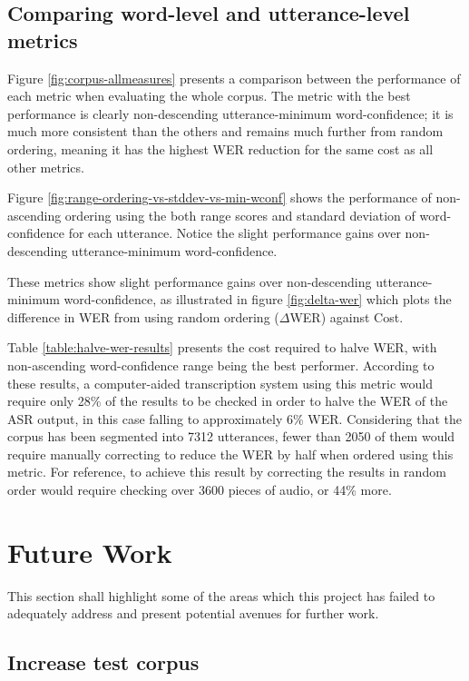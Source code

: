 \subsection{Comparing word-level and utterance-level metrics}

Figure \ref{fig:corpus-allmeasures} presents a comparison between the performance of each metric when evaluating the whole corpus.
The metric with the best performance is clearly non-descending utterance-minimum word-confidence; it is much more consistent than the others and remains much further from random ordering, meaning it has the highest WER reduction for the same cost as all other metrics.

Figure \ref{fig:range-ordering-vs-stddev-vs-min-wconf} shows the performance of non-ascending ordering using the both range scores and standard deviation of word-confidence for each utterance. 
Notice the slight performance gains over non-descending utterance-minimum word-confidence.

These metrics show slight performance gains over non-descending utterance-minimum word-confidence, as illustrated in figure \ref{fig:delta-wer} which plots the difference in WER from using random ordering ($\Delta$WER) against Cost.

Table \ref{table:halve-wer-results} presents the cost required to halve WER, with non-ascending word-confidence range being the best performer.
According to these results, a computer-aided transcription system using this metric would require only 28\% of the results to be checked in order to halve the WER of the ASR output, in this case falling to approximately 6\% WER.
Considering that the corpus has been segmented into 7312 utterances, fewer than 2050 of them would require manually correcting to reduce the WER by half when ordered using this metric.
For reference, to achieve this result by correcting the results in random order would require checking over 3600 pieces of audio, or 44\% more.

\section{Future Work}

This section shall highlight some of the areas which this project has failed to adequately address and present potential avenues for further work.

\subsection{Increase test corpus}

